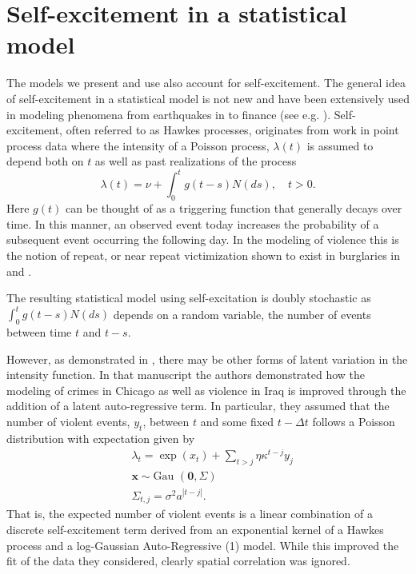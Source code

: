 \documentclass[11pt]{isuthesis}
\begin{document}
\section{Self-excitement in a statistical model}
The models we present and use also account for self-excitement.  The general idea of self-excitement in a statistical model is not new and have been extensively used in modeling phenomena from earthquakes in \cite{ogata1988statistical} to finance (see e.g. \cite{bacry2015hawkes}).  Self-excitement, often referred to as Hawkes processes, originates from \cite{hawkes1971spectra} work in point process data where the intensity of a Poisson process, $\lambda(t)$ is assumed to depend both on $t$ as well as past realizations of the process
\begin{equation}
\lambda(t)=\nu + \int_{0}^t g(t-s)N(ds),\quad t>0.
\end{equation}
Here $g(t)$ can be thought of as a triggering function that generally decays over time.  In this manner, an observed event today increases the probability of a subsequent event occurring the following day.  In the modeling of violence this is the notion of repeat, or near repeat victimization shown to exist in burglaries in \cite{johnson1997new} and \cite{johnson2007space}. 

The resulting statistical model using self-excitation is doubly stochastic as $\int_{0}^t g(t-s)N(ds)$ depends on a random variable, the number of events between time $t$ and $t-s$.  

However, as demonstrated in \cite{mohler2013modeling}, there may be other forms of latent variation in the intensity function.  In that manuscript the authors demonstrated how the modeling of crimes in Chicago as well as violence in Iraq is improved through the addition of a latent auto-regressive term.  In particular, they assumed that the number of violent events, $y_t$, between $t$ and some fixed $t-\Delta t$ follows a Poisson distribution with expectation given by
\begin{align}
& \lambda_t  =\exp(x_t)+\sum_{t>j} \eta \kappa^{t-j} y_j\\
& \boldsymbol{x} \sim \mbox{Gau }(\boldsymbol{0},\Sigma)\\
& \Sigma_{t,j} =\sigma^2 a^{|t-j|}.
\end{align}
That is, the expected number of violent events is a linear combination of a discrete self-excitement term derived from an exponential kernel of a Hawkes process and a log-Gaussian Auto-Regressive (1) model.  While this improved the fit of the data they considered, clearly spatial correlation was ignored.
\end{document}
